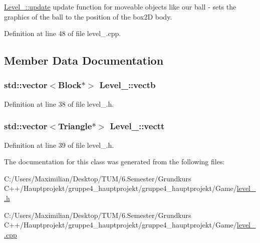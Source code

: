 \hyperlink{class_level__2_aecda66f24b228432774b66622e357b79}{Level\+\_\+::update} update function for moveable objects like our ball -\/ sets the graphics of the ball to the position of the box2D body. 



Definition at line 48 of file level\+\_.\+cpp.



\subsection{Member Data Documentation}
\subsubsection[{\texorpdfstring{vectb}{vectb}}]{\setlength{\rightskip}{0pt plus 5cm}std\+::vector$<${\bf Block}$\ast$$>$ Level\+\_\+::vectb}\hypertarget{class_level__2_aaba33e2422ee9c077787c13912ddf05f}{}\label{class_level__2_aaba33e2422ee9c077787c13912ddf05f}


Definition at line 38 of file level\+\_.\+h.

\subsubsection[{\texorpdfstring{vectt}{vectt}}]{\setlength{\rightskip}{0pt plus 5cm}std\+::vector$<${\bf Triangle}$\ast$$>$ Level\+\_\+::vectt}\hypertarget{class_level__2_ad1367daaa96a8c50955eb735a3606dde}{}\label{class_level__2_ad1367daaa96a8c50955eb735a3606dde}


Definition at line 39 of file level\+\_.\+h.



The documentation for this class was generated from the following files\+:\begin{DoxyCompactItemize}
\item 
C\+:/\+Users/\+Maximilian/\+Desktop/\+T\+U\+M/6.\+Semester/\+Grundkurs C++/\+Hauptprojekt/gruppe4\+\_\+hauptprojekt/gruppe4\+\_\+hauptprojekt/\+Game/\hyperlink{level__2_8h}{level\+\_.\+h}\item 
C\+:/\+Users/\+Maximilian/\+Desktop/\+T\+U\+M/6.\+Semester/\+Grundkurs C++/\+Hauptprojekt/gruppe4\+\_\+hauptprojekt/gruppe4\+\_\+hauptprojekt/\+Game/\hyperlink{level__2_8cpp}{level\+\_.\+cpp}\end{DoxyCompactItemize}
